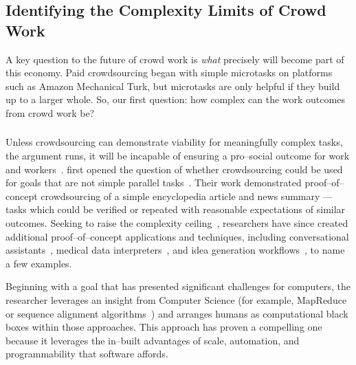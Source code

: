 \documentclass[trackingWork]{subfiles}
\begin{document}
\begin{comment}
Crowdwork
  - Kittur said let's do complex stuff
  - This works by using CS techniques
  - Clear that this works in focused cases
  - More recent shift toward using experts
\end{comment}

\subsection[What are the complexity limits of crowd work]
{Identifying the Complexity Limits of Crowd Work}\label{sec:complexity}
A key question to the future of crowd work is
\textit{what} precisely will become part of this economy.
Paid crowdsourcing began with simple microtasks on platforms such as
Amazon Mechanical Turk, but
microtasks are only helpful if they build up to a larger whole.
So, our first question:
how complex can the work outcomes from crowd work be?

\onlyinsubfile{\newpage}
\subsubsection{\crowdworkpers}

Unless crowdsourcing can demonstrate viability for meaningfully complex tasks,
the argument runs,
it will be incapable of ensuring a pro--social outcome for work and workers~\cite{crowdworkFuture}.
\citeauthor{crowdForgeKittur} first opened the question of
whether crowdsourcing could be used for goals that are not simple parallel tasks~\cite{crowdForgeKittur}.
Their work demonstrated proof--of--concept crowdsourcing of
a simple encyclopedia article and news summary
--- tasks which could be verified or repeated
with reasonable expectations of similar outcomes.
Seeking to raise the complexity ceiling~\cite{myers2000past},
researchers have since created
additional proof--of--concept applications and techniques,
including conversational assistants~\cite{lasecki2013chorus},
medical data interpreters~\cite{lasecki2013chorus}, and
idea generation workflows~\cite{YuEncouragingOutside,yu2014distributed,Yu2016a},
to name a few examples.

Beginning with a goal that has
presented significant challenges for computers,
the researcher leverages an insight from Computer Science
(for example, MapReduce~\cite{crowdForgeKittur} or
sequence alignment algorithms~\cite{lasecki2012real})
and arranges humans as computational black boxes within those approaches.
This approach has proven a compelling one because
it leverages the in--built advantages of
scale,
automation, and
programmability that software affords.
\end{document}
